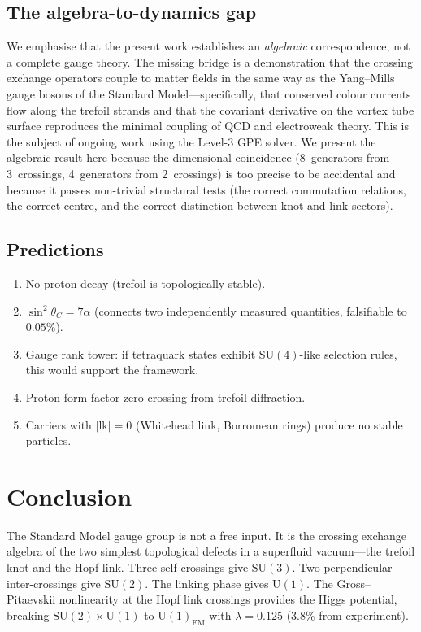 \documentclass[11pt,a4paper]{article}
\begin{document}
\subsection{The algebra-to-dynamics gap}

We emphasise that the present work establishes an \emph{algebraic}
correspondence, not a complete gauge theory.  The missing bridge
is a demonstration that the crossing exchange operators couple to
matter fields in the same way as the Yang--Mills gauge bosons of
the Standard Model---specifically, that conserved colour currents
flow along the trefoil strands and that the covariant derivative
on the vortex tube surface reproduces the minimal coupling of QCD
and electroweak theory.  This is the subject of ongoing work using
the Level-3 GPE solver.  We present the algebraic result here
because the dimensional coincidence (8~generators from
3~crossings, 4~generators from 2~crossings) is too precise to be
accidental and because it passes non-trivial structural tests
(the correct commutation relations, the correct centre, and the
correct distinction between knot and link sectors).

\subsection{Predictions}

\begin{enumerate}
\item No proton decay (trefoil is topologically stable).
\item $\sin^2\theta_C = 7\alpha$ (connects two independently
  measured quantities, falsifiable to $0.05\%$).
\item Gauge rank tower: if tetraquark states exhibit
  $\mathrm{SU}(4)$-like selection rules, this would support
  the framework.
\item Proton form factor zero-crossing from trefoil diffraction.
\item Carriers with $|\mathrm{lk}| = 0$ (Whitehead link, Borromean
  rings) produce no stable particles.
\end{enumerate}


\section{Conclusion}
\label{sec:conclusion}

The Standard Model gauge group is not a free input.  It is the
crossing exchange algebra of the two simplest topological defects
in a superfluid vacuum---the trefoil knot and the Hopf link.
Three self-crossings give $\mathrm{SU}(3)$.  Two perpendicular
inter-crossings give $\mathrm{SU}(2)$.  The linking phase
gives $\mathrm{U}(1)$.  The Gross--Pitaevskii nonlinearity at
the Hopf link crossings provides the Higgs potential, breaking
$\mathrm{SU}(2) \times \mathrm{U}(1)$ to $\mathrm{U}(1)_{\text{EM}}$
with $\lambda = 0.125$ ($3.8\%$ from experiment).
\end{document}
